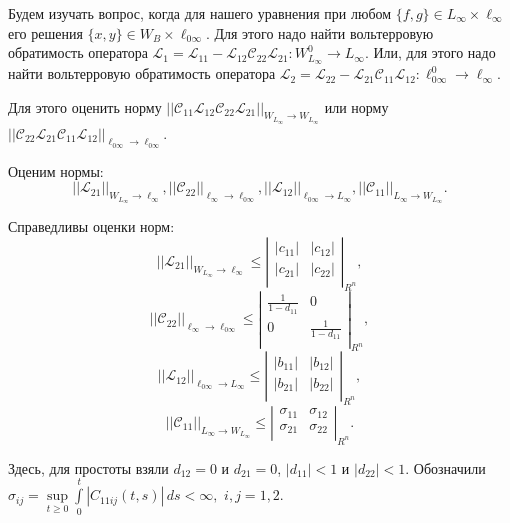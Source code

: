 Будем изучать вопрос, когда для нашего уравнения при любом $\{ f,g\} \in L_{\infty}\times \ell_{\infty}$ его решения $\{ x,y\} \in W_{B}\times \ell_{0\infty}$. Для этого надо найти вольтерровую обратимость оператора ${\mathcal L}_1= {\mathcal L}_{11} - {\mathcal L}_{12} {\mathcal C}_{22} {\mathcal L}_{21}: W_{L_{\infty}}^{0} \to L_{\infty}$. Или, для этого надо найти вольтерровую обратимость оператора ${\mathcal L}_2= {\mathcal L}_{22} - {\mathcal L}_{21} {\mathcal C}_{11} {\mathcal L}_{12}: \ell_{0\infty}^0 \to \ell_{\infty}$.

Для этого оценить норму $||{\mathcal C}_{11}{\mathcal L}_{12} {\mathcal C}_{22} {\mathcal L}_{21}||_{W_{L_{\infty}}\to W_{L_{\infty}}}$ или норму $||{\mathcal C}_{22}{\mathcal L}_{21} {\mathcal C}_{11} {\mathcal L}_{12}||_{{\ell_{0\infty}}\to {\ell_{0\infty}}}$.

Оценим нормы:
$$||{\mathcal L}_{21}||_{W_{L_{\infty}}\to \ell_{\infty}}, ||{\mathcal C}_{22}||_{\ell_{\infty}\to \ell_{0\infty}}, ||{\mathcal L}_{12}||_{\ell_{0\infty}\to L_{\infty}}, ||{\mathcal C}_{11}||_{L_{\infty}\to W_{L_{\infty}}}.$$

Справедливы оценки норм:
$$
||{\mathcal L}_{21}||_{W_{L_{\infty}}\to \ell_{\infty}} \leq
\left|\begin{array}{cc}
|c_{11}| & |c_{12}| \\
|c_{21}| & |c_{22}| \\
\end{array}\right|_{R^n},
$$
$$
||{\mathcal C}_{22}||_{\ell_{\infty}\to \ell_{0\infty}} \leq
\left|\begin{array}{cc}
\frac{1}{1-d_{11}} & 0 \\
0 & \frac{1}{1-d_{11}} \\
\end{array}\right|_{R^n},
$$
$$
||{\mathcal L}_{12}||_{\ell_{0\infty}\to L_{\infty}} \leq
\left|\begin{array}{cc}
|b_{11}| & |b_{12}| \\
|b_{21}| & |b_{22}| \\
\end{array}\right|_{R^n},
$$
$$
||{\mathcal C}_{11}||_{L_{\infty}\to W_{L_{\infty}}} \leq
\left|\begin{array}{cc}
\sigma_{11} & \sigma_{12} \\
\sigma_{21} & \sigma_{22} \\
\end{array}\right|_{R^n}.$$

Здесь, для простоты взяли $d_{12}=0$ и $d_{21}=0$, $|d_{11}| < 1$ и $|d_{22}| < 1$.
Обозначили $\sigma_{ij}= \sup\limits_{t \geq 0}\int\limits_{0}^{t}|C_{11ij}(t,s)|\,ds < \infty, $ $i,j=1,2$.	

